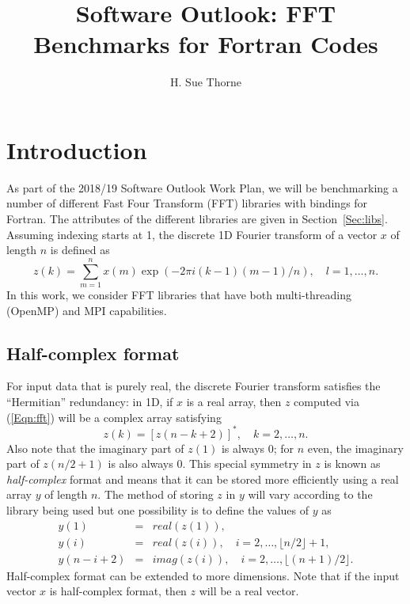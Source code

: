 \documentclass[a4]{article}
\begin{document}
\title{Software Outlook: FFT Benchmarks for Fortran Codes }
\author{H. Sue Thorne}

\maketitle


\section{Introduction}
As part of the 2018/19 Software Outlook Work Plan, we will be benchmarking 
a number of different Fast Four Transform (FFT) libraries with bindings for
Fortran. The attributes of the different libraries are given in 
Section~\ref{Sec:libs}. Assuming indexing starts at 1, the discrete 1D Fourier transform of a vector $x$ of length $n$ is defined as
\begin{equation}\label{Eqn:fft}
  z(k) = \sum_{m=1}^{n} x(m) \exp(-2\pi i (k-1) (m-1) / n), \quad l=1,\ldots,n.
\end{equation}
In this work, we consider FFT libraries that have both multi-threading (OpenMP) and MPI capabilities.

\subsection{Half-complex format}
For input data that is purely real, the discrete Fourier transform satisfies 
the ``Hermitian'' redundancy: in 1D, if $x$ is a real array, then $z$ computed 
via (\ref{Eqn:fft}) will be a complex array satisfying
$$z(k) = \left[z(n-k+2)\right]^*, \quad k=2,\ldots,n.$$ Also note that the 
imaginary part of $z(1)$ is always 0; for $n$ even, the imaginary part of 
$z(n/2 + 1) $ is also always 0. This special symmetry in $z$ is known as 
\textit{half-complex} format and means that it can 
be stored more efficiently using a real array $y$ of length $n.$ The method of 
storing $z$ in $y$ will vary according to the library being used but one 
possibility is to define the values of $y$ as
\begin{eqnarray*}
y(1) & = & real(z(1)),\\
y(i) & = & real(z(i)), \quad i=2,\ldots,\lfloor n/2 \rfloor +1,\\
y(n-i+2) & = & imag(z(i)), \quad i=2,\ldots, \lfloor (n+1)/2  \rfloor.
\end{eqnarray*} 
Half-complex format can 
be extended to more dimensions. Note that if the input vector $x$ is 
half-complex format, then $z$ will be a real vector.
\end{document}
